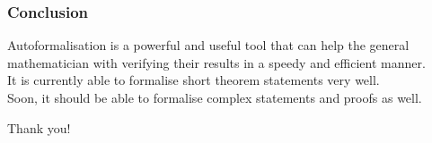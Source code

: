 \documentclass{beamer} %
\begin{document}
\begin{frame}
\frametitle{Conclusion}
Autoformalisation is a powerful and useful tool that can help the general mathematician with verifying their results in a speedy and efficient manner. \\ 
It is currently able to formalise short theorem statements very well. \\
Soon, it should be able to formalise complex statements and proofs as well.
\end{frame}

\begin{frame}
\begin{center}
Thank you!
\end{center}
\end{frame}
\end{document}
